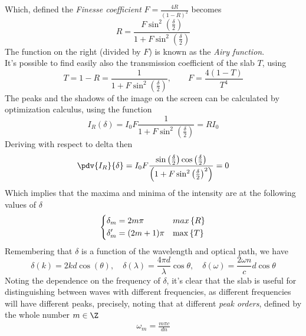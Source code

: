\documentclass[../electromagnetism.tex]{subfiles}
\begin{document}
Which, defined the \textit{Finesse coefficient} $F=\frac{4R}{(1-R)^2}$ becomes
\begin{equation}
	R=\frac{F\sin^2\left( \frac{\delta}{2} \right)}{1+F\sin^2\left( \frac{\delta}{2} \right)}
	\label{eq:refcoefffinesse.mbi}
\end{equation}
The function on the right (divided by $F$) is known as the \textit{Airy function}.\\
It's possible to find easily also the transmission coefficient of the slab $T$, using
\begin{equation}
	T=1-R=\frac{1}{1+F\sin^2\left( \frac{\delta}{2} \right)}, \qquad F=\frac{4(1-T)}{T^4}
	\label{eq:transcoefffinesse.mbi}
\end{equation}
The peaks and the shadows of the image on the screen can be calculated by optimization calculus, using the function
\begin{equation*}
	I_R(\delta)=I_0F\frac{1}{1+F\sin^2\left( \frac{\delta}{2} \right)}=RI_0
\end{equation*}
Deriving with respect to delta then
\begin{equation*}
	\pdv{I_R}{\delta}=I_0F\frac{\sin\left( \frac{\delta}{2} \right)\cos\left( \frac{\delta}{2} \right)}{\left( 1+F\sin^2\left( \frac{\delta}{2} \right)^2 \right)}=0
\end{equation*}
Which implies that the maxima and minima of the intensity are at the following values of $\delta$
\begin{equation}
	\begin{dcases}
		\delta_m=2m\pi&max\left\{ R \right\}\\
		\delta_m'=(2m+1)\pi&\max\left\{ T \right\}
	\end{dcases}
	\label{eq:maximaminimaI.mbi}
\end{equation}
Remembering that $\delta$ is a function of the wavelength and optical path, we have
\begin{equation*}
	\delta(k)=2kd\cos(\theta), \quad\delta(\lambda)=\frac{4\pi d}{\lambda}\cos\theta, \quad\delta(\omega)=\frac{2\omega n}{c}d\cos\theta
\end{equation*}
Noting the dependence on the frequency of $\delta$, it's clear that the slab is useful for distinguishing between waves with different frequencies, as different frequencies will have different peaks, precisely, noting that at different \textit{peak orders}, defined by the whole number $m\in\Z$
\begin{equation*}
	\begin{aligned}
		\omega_m=\frac{m\pi c}{dn}
	\end{aligned}
\end{equation*}
\end{document}
